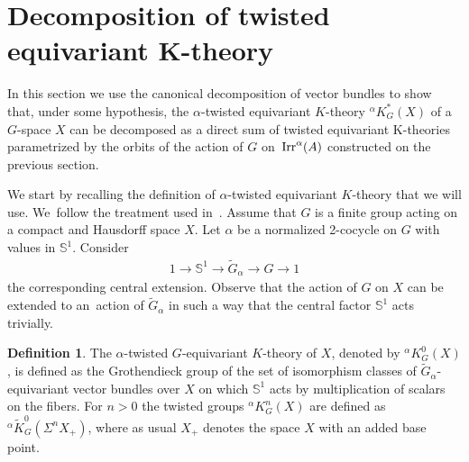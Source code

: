 \documentclass[11pt]{article}
\numberwithin{equation}{section}
\def\S{\mathbb{S}}
\DeclareMathOperator{\Irr}{\textup{Irr}}
\theoremstyle{definition}
\newtheorem{Def}[Th]{Definition}
\numberwithin{equation}{section}
\begin{document}
%
%

\section[Decomposition of twisted equivariant K-theory]
{Decomposition of twisted equivariant $\boldsymbol K$-theory}\label{Section 3}

In this section we use the canonical decomposition of vector bundles to show that,
under some hypothesis, the $\alpha$-twisted equivariant $K$-theory $^{\alpha}K^{\ast}_{G}(X)$ of a
$G$-space $X$ can be decomposed as a direct sum of twisted equivariant K-theories parametrized
by the orbits of the action of $G$ on~$\Irr^{\alpha}(A)$ constructed on the previous section.

We start by recalling the definition of $\alpha$-twisted equivariant $K$-theory that we will use.
We~fol\-low the treatment used in~\cite[Section 7.2]{AdemRuan}.
Assume that $G$ is a finite group acting on a compact and Hausdorff space $X$.
Let $\alpha$ be a normalized 2-cocycle on $G$ with values in $\S^{1}$. Consider
\begin{gather*}
1\rightarrow \S^{1}\rightarrow \widetilde{G}_{\alpha}\rightarrow G\rightarrow 1
\end{gather*}
the corresponding central extension. Observe that the action of $G$ on $X$ can be
extended to an~action of $\widetilde{G}_{\alpha}$ in such a way that the central factor $\S^{1}$
acts trivially.

\begin{Def}\label{usualdeftwisted}
The $\alpha$-twisted $G$-equivariant $K$-theory of $X$, denoted by $^{\alpha}K_{G}^{0}(X)$,
is defined as the Grothendieck group of the set of isomorphism classes of
$\widetilde{G}_{\alpha}$-equivariant vector bundles over $X$ on which
$\S^{1}$ acts by multiplication of scalars on the fibers. For $n>0$ the twisted groups
$^{\alpha}K_{G}^{n}(X)$ are defined as
$^{\alpha}\tilde{K}_{G}^{0}(\Sigma^{n}X_{+})$, where as usual $X_{+}$
denotes the space $X$ with an added base point.
\end{Def}
\end{document}
